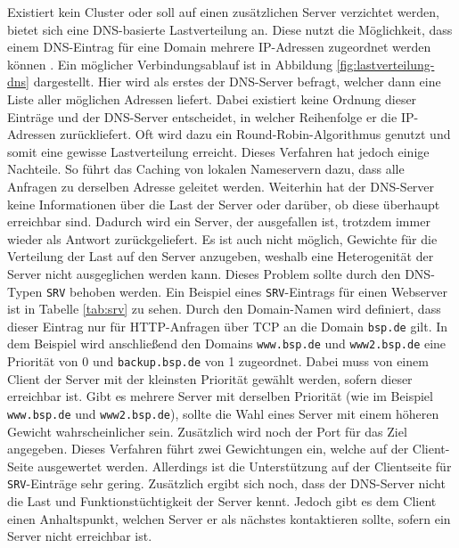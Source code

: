 \documentclass[a4paper, 12pt, BCOR10mm, DIV12, toc=bibliography, toc=listof, german]{scrbook}
\begin{document}
			Existiert kein Cluster oder soll auf einen zusätzlichen Server verzichtet werden, bietet sich
			eine DNS-basierte Lastverteilung an. Diese nutzt die Möglichkeit, dass einem DNS-Eintrag für
			eine Domain mehrere IP-Adressen zugeordnet werden können \cite{rfc1034}. Ein möglicher
			Verbindungsablauf ist in Abbildung \ref{fig:lastverteilung-dns} dargestellt. Hier wird als
			erstes der DNS-Server befragt, welcher dann eine Liste aller möglichen Adressen liefert. Dabei
			existiert keine Ordnung dieser Einträge und der DNS-Server entscheidet, in welcher Reihenfolge
			er die IP-Adressen zurückliefert. Oft wird dazu ein Round-Robin-Algorithmus genutzt und somit
			eine gewisse Lastverteilung erreicht. Dieses Verfahren hat jedoch einige Nachteile. So führt
			das Caching von lokalen Nameservern dazu, dass alle Anfragen zu derselben Adresse geleitet
			werden. Weiterhin hat der DNS-Server keine Informationen über die Last der Server oder
			darüber, ob diese überhaupt erreichbar sind. Dadurch wird ein Server, der ausgefallen ist,
			trotzdem immer wieder als Antwort zurückgeliefert. Es ist auch nicht möglich, Gewichte für die
			Verteilung der Last auf den Server anzugeben, weshalb eine Heterogenität der Server nicht
			ausgeglichen werden kann. Dieses Problem sollte durch den DNS-Typen \texttt{SRV}
			\cite{rfc2782} behoben werden.  Ein Beispiel eines \texttt{SRV}-Eintrags für einen Webserver
			ist in Tabelle \ref{tab:srv} zu sehen. Durch den Domain-Namen wird definiert, dass dieser
			Eintrag nur für HTTP-Anfragen über TCP an die Domain \texttt{bsp.de} gilt. In dem Beispiel
			wird anschließend den Domains \texttt{www.bsp.de} und \texttt{www2.bsp.de} eine Priorität von
			0 und \texttt{backup.bsp.de} von 1 zugeordnet. Dabei muss von einem Client der Server mit der
			kleinsten Priorität gewählt werden, sofern dieser erreichbar ist. Gibt es mehrere Server mit
			derselben Priorität (wie im Beispiel \texttt{www.bsp.de} und \texttt{www2.bsp.de}), sollte die
			Wahl eines Server mit einem höheren Gewicht wahrscheinlicher sein. Zusätzlich wird noch der
			Port für das Ziel angegeben.  Dieses Verfahren führt zwei Gewichtungen ein, welche auf der
			Client-Seite ausgewertet werden.  Allerdings ist die Unterstützung auf der Clientseite für
			\texttt{SRV}-Einträge sehr gering. Zusätzlich ergibt sich noch, dass der DNS-Server nicht die
			Last und Funktionstüchtigkeit der Server kennt.  Jedoch gibt es dem Client einen Anhaltspunkt,
			welchen Server er als nächstes kontaktieren sollte, sofern ein Server nicht erreichbar ist.
\end{document}

